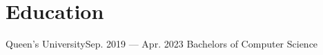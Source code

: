 \section{Education}
    \resumeSubHeadingListStart

    \resumeSubheading
    {Queen's University}{Sep. 2019 --- Apr. 2023}
    {Bachelors of Computer Science}{}

    \resumeSubHeadingListEnd
